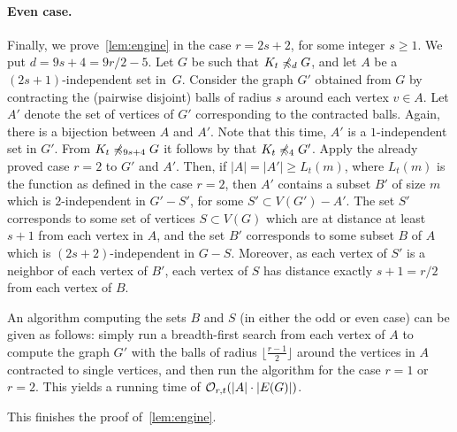 \paragraph{Even case.}
 Finally,
 we prove~\cref{lem:engine} in the case $r=2s+2$, for some integer $s\geq 1$. We put $d=9s+4=9r/2-5$.
Let $G$  be such that 
 $K_t\not\preccurlyeq_{d} G$, and
let $A$ be a $(2s+1)$-independent set in~$G$. Consider the graph $G'$ obtained from $G$
by contracting the (pairwise disjoint) balls of radius $s$ around each vertex $v\in A$.
 Let $A'$ denote the set of vertices of $G'$ corresponding to the contracted balls. Again, there is a bijection between $A$ and $A'$. Note that
this time, $A'$ is a $1$-independent set in $G'$.
From $K_t\not\preccurlyeq_{9s+4} G$ it follows by  that $K_t\not\preccurlyeq_4 G'$. Apply the already proved case $r=2$ to $G'$ and $A'$. 
Then, if $|A|=|A'|\ge L_t(m)$, where $L_t(m)$ is the function as defined in the case $r=2$, then
 $A'$ contains a subset $B'$ of size $m$
which is  $2$-independent in $G'-S'$, for some $S'\subset V(G')-A'$.
The set $S'$ corresponds to some set of vertices $S\subset V(G)$
which are at distance at least $s+1$ from each vertex in $A$,
and the set  $B'$ corresponds to some subset $B$ of $A$
which is $(2s+2)$-independent in $G-S$. Moreover, as each vertex of $S'$
is a neighbor of each vertex of $B'$,  each vertex of $S$
has distance exactly $s+1=r/2$ from each vertex of $B$.

\medskip
An algorithm computing the sets $B$ and $S$ (in either the odd or even case) can be given as follows:
simply run a breadth-first search from each vertex of $A$ to compute the graph $G'$ with the balls of radius  $\lfloor \frac{r-1}2 \rfloor$  around the vertices in $A$ contracted to single vertices, 
and then run the algorithm for the case $r=1$ or $r=2$.
This yields a running time of  $\mathcal{O}_{r,t}(|A|\cdot |E(G)|)$.
 \medskip
  
This finishes  the proof of~\cref{lem:engine}.


